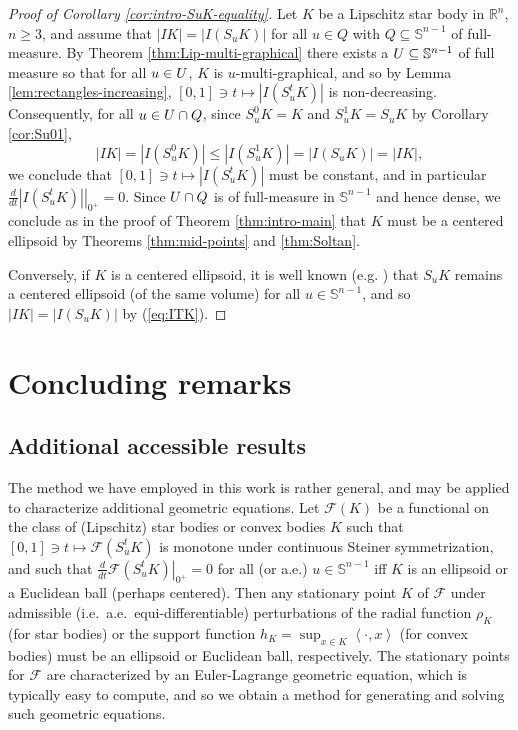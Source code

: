 \documentclass[11pt]{article}
\theoremstyle{definition}
\theoremstyle{proof}
\newcommand{\dt}[1]{\left . \frac{d}{dt} #1 \right |_{0^+}}
\DeclareMathOperator{\+}{\mathop{\tilde{+}}}
\newcommand{\scalar}[1]{\left \langle #1 \right \rangle}
\newcommand{\R}{\mathbb{R}}
\renewcommand{\S}{\mathbb{S}}
\newcommand{\F}{\mathcal{F}}
\numberwithin{equation}{section}
\numberwithin{equation}{section}
\begin{document}
\begin{proof}[Proof of Corollary \ref{cor:intro-SuK-equality}]
Let $K$ be a Lipschitz star body in $\R^n$, $n \geq 3$, and assume that $|I K| = |I(S_u K)|$ for all $u \in Q$ with $Q \subseteq \S^{n-1}$ of full-measure. By Theorem \ref{thm:Lip-multi-graphical} there exists a $\U \subseteq \S^{n-1}$ of full measure so that for all $u \in U$, $K$ is $u$-multi-graphical, and so by Lemma \ref{lem:rectangles-increasing}, $[0,1] \ni t \mapsto |I(S_u^t K)|$ is non-decreasing. Consequently, for all $u \in U \cap Q$, since $S_u^0 K = K$ and $S_u^1 K = S_u K$ by Corollary \ref{cor:Su01},\[
|I K| = |I(S_u^0 K)| \leq |I(S_u^1 K)| = |I(S_u K)| = |I K|,
\]
 we conclude that $[0,1] \ni t \mapsto |I(S_u^t K)|$ must be constant, and in particular $\dt{|I(S_u^t K)|} = 0$. Since $U \cap Q$ is of full-measure in $\S^{n-1}$ and hence dense, we conclude as in the proof of Theorem \ref{thm:intro-main} that $K$ must be a centered ellipsoid by Theorems \ref{thm:mid-points} and \ref{thm:Soltan}. 
 
 Conversely, if $K$ is a centered ellipsoid, it is well known (e.g. \cite[Lemma 2]{BLM-SteinerSymmetrizations}) that $S_u K$ remains a centered ellipsoid (of the same volume) for all $u \in \S^{n-1}$, and so $|I K| = |I(S_u K)|$ by (\ref{eq:ITK}). 
\end{proof}



\section{Concluding remarks} \label{sec:conclude}

\subsection{Additional accessible results} 

The method we have employed in this work is rather general, and may be applied to characterize additional geometric equations. Let $\F(K)$ be a functional on the class of (Lipschitz) star bodies or convex bodies $K$ such that $[0,1] \ni t \mapsto \F(S_u^t K)$ is monotone under continuous Steiner symmetrization, and such that 
$\dt{\F(S^t_u K)} = 0$ for all (or a.e.) $u \in \S^{n-1}$ iff $K$ is an ellipsoid or a Euclidean ball (perhaps centered). Then any stationary point $K$ of $\F$ under admissible (i.e.~a.e.~equi-differentiable) perturbations of the radial function $\rho_K$ (for star bodies) or the support function $h_K = \sup_{x \in K} \scalar{\cdot,x}$ (for convex bodies) must be an ellipsoid or Euclidean ball, respectively. The stationary points for $\F$ are characterized by an Euler-Lagrange geometric equation, which is typically easy to compute, and so we obtain a method for generating and solving such geometric equations. 
\end{document}
